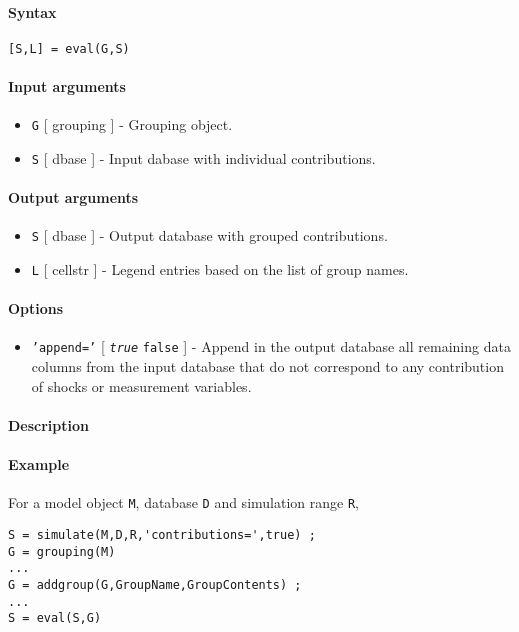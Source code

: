 


	\paragraph{Syntax}

\begin{verbatim}
[S,L] = eval(G,S)
\end{verbatim}

\paragraph{Input arguments}

\begin{itemize}
\item
  \texttt{G} {[} grouping {]} - Grouping object.
\item
  \texttt{S} {[} dbase {]} - Input dabase with individual contributions.
\end{itemize}

\paragraph{Output arguments}

\begin{itemize}
\item
  \texttt{S} {[} dbase {]} - Output database with grouped contributions.
\item
  \texttt{L} {[} cellstr {]} - Legend entries based on the list of group
  names.
\end{itemize}

\paragraph{Options}

\begin{itemize}
\itemsep1pt\parskip0pt
\item
  \texttt{'append='} {[} \emph{\texttt{true}} \textbar{} \texttt{false}
  {]} - Append in the output database all remaining data columns from
  the input database that do not correspond to any contribution of
  shocks or measurement variables.
\end{itemize}

\paragraph{Description}

\paragraph{Example}

For a model object \texttt{M}, database \texttt{D} and simulation range
\texttt{R},

\begin{verbatim}
S = simulate(M,D,R,'contributions=',true) ;
G = grouping(M)
...
G = addgroup(G,GroupName,GroupContents) ;
...
S = eval(S,G)
\end{verbatim}


